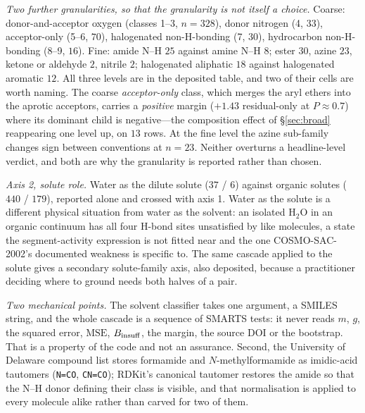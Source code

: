\emph{Two further granularities, so that the granularity is not itself a choice.} Coarse:
donor-and-acceptor oxygen (classes 1--3, $n{=}328$), donor nitrogen (4, $33$), acceptor-only (5--6,
$70$), halogenated non-H-bonding (7, $30$), hydrocarbon non-H-bonding (8--9, $16$). Fine: amide N--H
$25$ against amine N--H $8$; ester $30$, azine $23$, ketone or aldehyde $2$, nitrile $2$; halogenated
aliphatic $18$ against halogenated aromatic $12$. All three levels are in the deposited table, and
two of their cells are worth naming. The coarse \emph{acceptor-only} class, which merges the aryl
ethers into the aprotic acceptors, carries a \emph{positive} margin ($+1.43$ residual-only at
$P\approx0.7$) where its dominant child is negative---the composition effect of
\S\ref{sec:broad} reappearing one level up, on $13$ rows. At the fine level the azine
sub-family changes sign between conventions at $n{=}23$. Neither overturns a headline-level verdict,
and both are why the granularity is reported rather than chosen.

\emph{Axis 2, solute role.} Water as the dilute solute ($37$ / $6$) against organic solutes ($440$ /
$179$), reported alone and crossed with axis 1. Water as the solute is a different physical situation
from water as the solvent: an isolated H$_2$O in an organic continuum has all four H-bond sites
unsatisfied by like molecules, a state the segment-activity expression is not fitted near and the one
COSMO-SAC-2002's documented weakness is specific to. The same cascade applied to the solute gives a
secondary solute-family axis, also deposited, because a practitioner deciding where to ground needs
both halves of a pair.

\emph{Two mechanical points.} The solvent classifier takes one argument, a SMILES string, and the
whole cascade is a sequence of SMARTS tests: it never reads $m$, $g$, the squared error,
$\mathrm{MSE}$, $B_{\mathrm{insuff}}$, the margin, the source DOI or the bootstrap. That is a property of the
code and not an assurance. Second, the University of Delaware compound list stores formamide and
$N$-methylformamide as imidic-acid tautomers (\texttt{N=CO}, \texttt{CN=CO}); RDKit's canonical
tautomer restores the amide so that the N--H donor defining their class is visible, and that
normalisation is applied to every molecule alike rather than carved for two of them.

